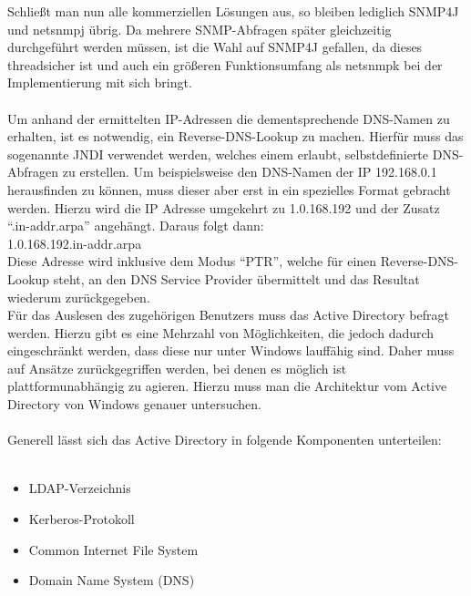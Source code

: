Schließt man nun alle kommerziellen Lösungen aus, so bleiben lediglich SNMP4J und netsnmpj übrig.
Da mehrere SNMP-Abfragen später gleichzeitig durchgeführt werden müssen, ist die Wahl auf SNMP4J gefallen, da dieses threadsicher ist und auch ein größeren Funktionsumfang als netsnmpk bei der Implementierung mit sich bringt.\\\\
Um anhand der ermittelten IP-Adressen die dementsprechende DNS-Namen zu erhalten, ist es notwendig, ein Reverse-DNS-Lookup zu machen.
Hierfür muss das sogenannte JNDI verwendet werden, welches einem erlaubt, selbstdefinierte DNS-Abfragen zu erstellen.
Um beispielsweise den DNS-Namen der IP 192.168.0.1 herausfinden zu können, muss dieser aber erst in ein spezielles Format gebracht werden. Hierzu wird die IP Adresse umgekehrt zu 1.0.168.192 und der Zusatz “.in-addr.arpa” angehängt. Daraus folgt dann:\\

1.0.168.192.in-addr.arpa\\

Diese Adresse wird inklusive dem Modus “PTR”, welche für einen Reverse-DNS-Lookup steht, an den DNS Service Provider übermittelt und das Resultat wiederum zurückgegeben.\\

Für das Auslesen des zugehörigen Benutzers muss das Active Directory befragt werden.
Hierzu gibt es eine Mehrzahl von Möglichkeiten, die jedoch dadurch eingeschränkt werden, dass diese nur unter Windows lauffähig sind. Daher muss auf Ansätze zurückgegriffen werden, bei denen es möglich ist plattformunabhängig zu agieren. Hierzu muss man die Architektur vom Active Directory von Windows genauer untersuchen.\\\\
Generell lässt sich das Active Directory in folgende Komponenten unterteilen:\\
\\
\begin{itemize}
\item LDAP-Verzeichnis
\item Kerberos-Protokoll
\item Common Internet File System
\item Domain Name System (DNS)
\end{itemize}

